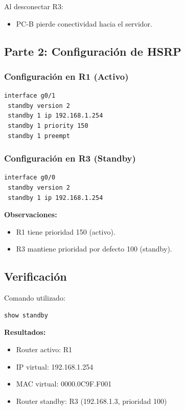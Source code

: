 \documentclass[12pt]{article}
\begin{document}
Al desconectar R3:
\begin{itemize}
    \item PC-B pierde conectividad hacia el servidor.
\end{itemize}

\subsection{Parte 2: Configuración de HSRP}

\subsubsection{Configuración en R1 (Activo)}

\begin{verbatim}
interface g0/1
 standby version 2
 standby 1 ip 192.168.1.254
 standby 1 priority 150
 standby 1 preempt
\end{verbatim}

\subsubsection{Configuración en R3 (Standby)}

\begin{verbatim}
interface g0/0
 standby version 2
 standby 1 ip 192.168.1.254
\end{verbatim}

\textbf{Observaciones:}
\begin{itemize}
    \item R1 tiene prioridad 150 (activo).
    \item R3 mantiene prioridad por defecto 100 (standby).
\end{itemize}

\subsection{Verificación}

Comando utilizado:

\begin{verbatim}
show standby
\end{verbatim}

\textbf{Resultados:}
\begin{itemize}
    \item Router activo: R1
    \item IP virtual: 192.168.1.254
    \item MAC virtual: 0000.0C9F.F001
    \item Router standby: R3 (192.168.1.3, prioridad 100)
\end{itemize}
\end{document}
